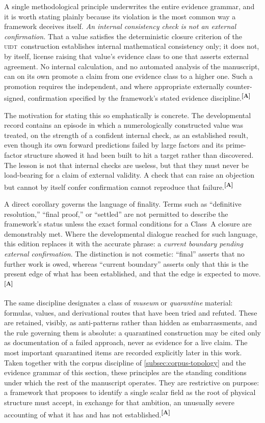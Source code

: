 \documentclass[12pt,a4paper,twoside]{article}
\theoremstyle{plain}
\theoremstyle{definition}
\theoremstyle{remark}
\newcommand{\UIDT}{\textsc{uidt}}
\newcommand{\catmark}[1]{\textsuperscript{\textsf{\textbf{[#1]}}}}
\begin{document}
A single methodological principle underwrites the entire evidence grammar, and it is worth stating plainly because its violation is the most common way a framework deceives itself. \emph{An internal consistency check is not an external confirmation.} That a value satisfies the deterministic closure criterion of the \UIDT\ construction establishes internal mathematical consistency only; it does not, by itself, license raising that value's evidence class to one that asserts external agreement. No internal calculation, and no automated analysis of the manuscript, can on its own promote a claim from one evidence class to a higher one. Such a promotion requires the independent, and where appropriate externally counter-signed, confirmation specified by the framework's stated evidence discipline.\catmark{A}

The motivation for stating this so emphatically is concrete. The developmental record contains an episode in which a numerologically constructed value was treated, on the strength of a confident internal check, as an established result, even though its own forward predictions failed by large factors and its prime-factor structure showed it had been built to hit a target rather than discovered. The lesson is not that internal checks are useless, but that they must never be load-bearing for a claim of external validity. A check that can raise an objection but cannot by itself confer confirmation cannot reproduce that failure.\catmark{A}

A direct corollary governs the language of finality. Terms such as ``definitive resolution,'' ``final proof,'' or ``settled'' are not permitted to describe the framework's status unless the exact formal conditions for a Class~A closure are demonstrably met. Where the developmental dialogue reached for such language, this edition replaces it with the accurate phrase: a \emph{current boundary pending external confirmation}. The distinction is not cosmetic: ``final'' asserts that no further work is owed, whereas ``current boundary'' asserts only that this is the present edge of what has been established, and that the edge is expected to move.\catmark{A}

The same discipline designates a class of \emph{museum} or \emph{quarantine} material: formulas, values, and derivational routes that have been tried and refuted. These are retained, visibly, as anti-patterns rather than hidden as embarrassments, and the rule governing them is absolute: a quarantined construction may be cited only as documentation of a failed approach, never as evidence for a live claim. The most important quarantined items are recorded explicitly later in this work. Taken together with the corpus discipline of \cref{subsec:corpus-topology} and the evidence grammar of this section, these principles are the standing conditions under which the rest of the manuscript operates. They are restrictive on purpose: a framework that proposes to identify a single scalar field as the root of physical structure must accept, in exchange for that ambition, an unusually severe accounting of what it has and has not established.\catmark{A}
\end{document}
